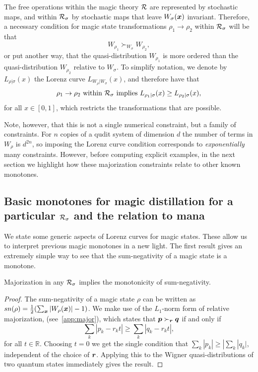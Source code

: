 \documentclass[pra,
aps,
twocolumn,
superscriptaddress,
groupedaddress,
nofootinbib,
reprint
]{revtex4-1}
\begin{document}
The free operations within the magic theory ${\mathcal R}$ are represented by stochastic maps, and within ${\mathcal R}_\sigma$ by stochastic maps that leave $W_\sigma(\boldsymbol{x})$ invariant. Therefore, a necessary condition for magic state transformations $\rho_1 \rightarrow \rho_2$ within ${\mathcal R}_\sigma$ will be that 
\begin{equation}
	W_{\rho_1} \succ_{W_{\sigma}} W_{\rho_2},
\end{equation}
or put another way, that the quasi-distribution $W_{\rho_1}$ is more ordered than the quasi-distribution $W_{\rho_2}$ relative to $W_\sigma$. To simplify notation, we denote by $L_{\rho | \sigma}(x)$ the Lorenz curve $L_{W_{\rho} | W_{\sigma}} (x)$, and therefore have that
\begin{equation}
\rho_1 \rightarrow \rho_2 \mbox{ within }{\mathcal R}_\sigma \mbox{ implies } L_{\rho_1 |\sigma} (x) \ge L_{\rho_2 |\sigma} (x),
\end{equation}
for all $x \in [0,1]$, which restricts the transformations that are possible.

  Note, however, that this is not a single numerical constraint, but a family of constraints. For $n$ copies of a qudit system of dimension $d$ the number of terms in $W_{\rho}$ is $d^{2n}$, so imposing the Lorenz curve condition corresponds to \emph{exponentially} many constraints. However,  before computing explicit examples, in the next section we highlight how these majorization constraints relate to other known monotones.

\subsection{Basic monotones for magic distillation for a particular ${\mathcal R}_\sigma$ and the relation to mana}
\label{sec:monotones_frag}

We state some generic aspects of Lorenz curves for magic states. These allow us to interpret previous magic monotones in a new light. The first result gives an extremely simple way to see that the sum-negativity of a magic state is a monotone.

\begin{lemma} Majorization in any ${\mathcal R}_\sigma$ implies the monotonicity of sum-negativity. 
\end{lemma}
\begin{proof}
	The sum-negativity of a magic state $\rho$ can be written as $sn(\rho) =\frac{1}{2} (\sum_{\boldsymbol{x}} |W_\rho(\boldsymbol{x}) | - 1)$.
We make use of the $L_1$-norm form of relative majorization, (see~\cref{app:major}), which states that $\boldsymbol{p} \succ_{\boldsymbol{r}} \boldsymbol{q}$ if and only if
	\begin{equation}
\sum_k | p_k - r_k t | \geq \sum_k | q_k - r_k t |,
\end{equation}
for all $t\in \mathbb{R}$. Choosing $t=0$ we get the single condition that $\sum_k |p_k| \ge |\sum_k |q_k|$, independent of the choice of $\boldsymbol{r}$. Applying this to the Wigner quasi-distributions of two quantum states immediately gives the result.
\end{proof}
\end{document}
